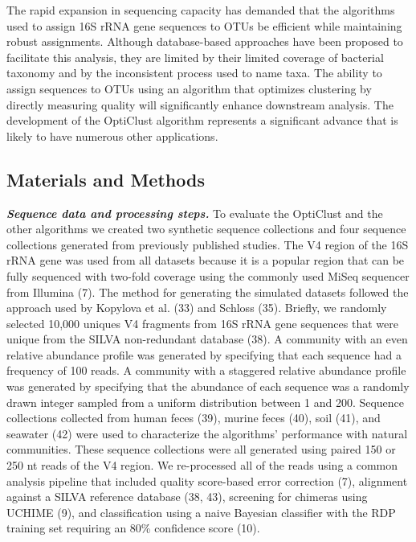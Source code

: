 \documentclass[11pt,]{article}
\begin{document}
The rapid expansion in sequencing capacity has demanded that the
algorithms used to assign 16S rRNA gene sequences to OTUs be efficient
while maintaining robust assignments. Although database-based approaches
have been proposed to facilitate this analysis, they are limited by
their limited coverage of bacterial taxonomy and by the inconsistent
process used to name taxa. The ability to assign sequences to OTUs using
an algorithm that optimizes clustering by directly measuring quality
will significantly enhance downstream analysis. The development of the
OptiClust algorithm represents a significant advance that is likely to
have numerous other applications.

\subsection{Materials and Methods}\label{materials-and-methods}

\textbf{\emph{Sequence data and processing steps.}} To evaluate the
OptiClust and the other algorithms we created two synthetic sequence
collections and four sequence collections generated from previously
published studies. The V4 region of the 16S rRNA gene was used from all
datasets because it is a popular region that can be fully sequenced with
two-fold coverage using the commonly used MiSeq sequencer from Illumina
(7). The method for generating the simulated datasets followed the
approach used by Kopylova et al. (33) and Schloss (35). Briefly, we
randomly selected 10,000 uniques V4 fragments from 16S rRNA gene
sequences that were unique from the SILVA non-redundant database (38). A
community with an even relative abundance profile was generated by
specifying that each sequence had a frequency of 100 reads. A community
with a staggered relative abundance profile was generated by specifying
that the abundance of each sequence was a randomly drawn integer sampled
from a uniform distribution between 1 and 200. Sequence collections
collected from human feces (39), murine feces (40), soil (41), and
seawater (42) were used to characterize the algorithms' performance with
natural communities. These sequence collections were all generated using
paired 150 or 250 nt reads of the V4 region. We re-processed all of the
reads using a common analysis pipeline that included quality score-based
error correction (7), alignment against a SILVA reference database (38,
43), screening for chimeras using UCHIME (9), and classification using a
naive Bayesian classifier with the RDP training set requiring an 80\%
confidence score (10).
\end{document}
